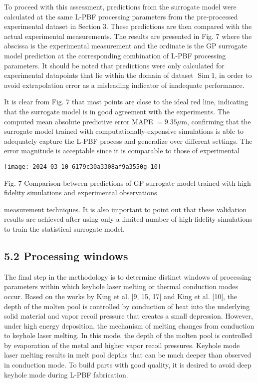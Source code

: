 \documentclass[10pt]{article}
\begin{document}
To proceed with this assessment, predictions from the surrogate model were calculated at the same L-PBF processing parameters from the pre-processed experimental dataset in Section 3. These predictions are then compared with the actual experimental measurements. The results are presented in Fig. 7 where the abscissa is the experimental measurement and the ordinate is the GP surrogate model prediction at the corresponding combination of L-PBF processing parameters. It should be noted that predictions were only calculated for experimental datapoints that lie within the domain of dataset $\operatorname{Sim} 1$, in order to avoid extrapolation error as a misleading indicator of inadequate performance.

It is clear from Fig. 7 that most points are close to the ideal red line, indicating that the surrogate model is in good agreement with the experiments. The computed mean absolute predictive error MAPE $=9.35 \mu \mathrm{m}$, confirming that the surrogate model trained with computationally-expensive simulations is able to adequately capture the L-PBF process and generalize over different settings. The error magnitude is acceptable since it is comparable to those of experimental

\begin{center}
\texttt{[image: 2024\_03\_10\_6179c30a3308af9a3550g-10]}
\end{center}

Fig. 7 Comparison between predictions of GP surrogate model trained with high-fidelity simulations and experimental observations

measurement techniques. It is also important to point out that these validation results are achieved after using only a limited number of high-fidelity simulations to train the statistical surrogate model.

\subsection*{5.2 Processing windows}
The final step in the methodology is to determine distinct windows of processing parameters within which keyhole laser melting or thermal conduction modes occur. Based on the works by King et al. [9, 15, 17] and King et al. [10], the depth of the molten pool is controlled by conduction of heat into the underlying solid material and vapor recoil pressure that creates a small depression. However, under high energy deposition, the mechanism of melting changes from conduction to keyhole laser melting. In this mode, the depth of the molten pool is controlled by evaporation of the metal and higher vapor recoil pressures. Keyhole mode laser melting results in melt pool depths that can be much deeper than observed in conduction mode. To build parts with good quality, it is desired to avoid deep keyhole mode during L-PBF fabrication.
\end{document}
